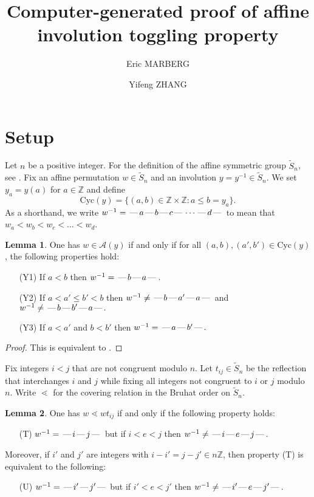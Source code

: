 \documentclass[10pt]{article}
\theoremstyle{definition}
\theoremstyle{definition}
\newtheorem{lemma}{Lemma}
\def\dash{\text{\hspace{0.5mm}---\hspace{0.5mm}}}
\def\Cyc{\mathrm{Cyc}}
\def\ZZ{\mathbb{Z}}
\def\cA{\mathcal{A}}
\begin{document}
\title{Computer-generated proof of affine involution toggling property}
\author{Eric MARBERG \and Yifeng ZHANG}
\maketitle
\tableofcontents

\section{Setup}

Let $n$ be a positive integer.
For the definition of the affine symmetric group $\tilde S_n$, see \cite{M}.
Fix an affine permutation $w \in \tilde S_n$ and an involution $y =y^{-1} \in\tilde S_n$.
We set $y_a = y(a)$ for $a \in \ZZ$ and define
\[\Cyc(y) = \{ (a,b) \in \ZZ\times\ZZ : a \leq b = y_a\}.\]
As a shorthand, we write $w^{-1} = \dash a\dash b\dash c \dash \cdots\dash d \dash$
to mean that $w_a < w_b < w_c < \dots < w_d$.

\begin{lemma}\label{lem-1}
One has $w \in \cA(y)$
if and only if for all $(a,b),(a',b') \in \Cyc(y)$, the following properties hold:
\begin{enumerate}
\item[(Y1)] If $a < b$ then $w^{-1} = \dash b \dash a \dash$.
\item[(Y2)] If $a < a' \leq b' < b$ then $w^{-1} \neq \dash b \dash a' \dash a \dash$
and $w^{-1}\neq \dash b \dash b' \dash a \dash.$
\item[(Y3)] If $a < a'$ and $b < b'$ then $w^{-1} = \dash a \dash b' \dash.$
\end{enumerate}
\end{lemma}

\begin{proof}
This is equivalent to \cite[Theorem 7.6]{M}.
\end{proof}

Fix integers $i < j$ that are not congruent modulo $n$.
Let $t_{ij} \in \tilde S_n$ be the reflection
that interchanges $i$ and $j$ while fixing all integers not congruent to
$i$ or $j$ modulo $n$.
Write $\lessdot$ for the covering relation in the Bruhat order on $\tilde S_n$.

\begin{lemma}\label{lem-2}
One has $w \lessdot wt_{ij}$
if and only if the following property holds:
\begin{enumerate}
\item[(T)] $w^{-1} = \dash i \dash j \dash$ but if $i<e<j$
then $w^{-1} \neq \dash i \dash e \dash j\dash$.
\end{enumerate}
Moreover, if $i'$ and $j'$ are integers with $i-i' = j-j' \in n\ZZ$,
then property (T) is equivalent to the following:
\begin{enumerate}
\item[(U)] $w^{-1} = \dash i' \dash j' \dash$ but if $i'<e<j'$
then $w^{-1} \neq \dash i' \dash e \dash j'\dash$.
\end{enumerate}
\end{lemma}
\end{document}
